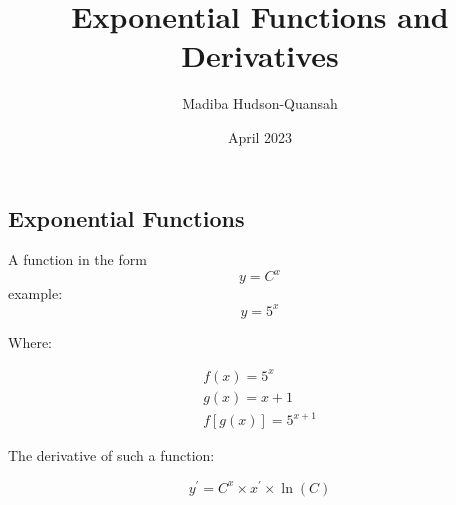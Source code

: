 \documentclass[12pt letter]{report}
\title{\Huge{Exponential Functions and Derivatives}}
\author{\huge{Madiba Hudson-Quansah}}
\date{April 2023}
\begin{document}
\maketitle
\newpage
{}
\tableofcontents
\pagebreak

\chapter{}
\section{Exponential Functions}

A function in the form
\[
	y = C^{x}
\]
example:
\[
	y = 5^{x}
\]

Where:

\begin{gather*}
	f(x) = 5^{x} \\
	g(x) = x+1\\[10pt]
	f[g(x)] = 5^{x+1}
\end{gather*}

The derivative of such a function:

\[
	y^{\prime} = C^{x}  \times x^{\prime}  \times  \ln(C)
\]


\end{document}
